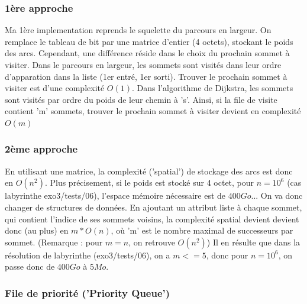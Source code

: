 \documentclass[10pt]{article}
\begin{document}
			\subsubsection{1ère approche}
				Ma 1ère implementation reprends le squelette du parcours en largeur.\newline\newline
				On remplace le tableau de bit par une matrice d'entier (4 octets), stockant le poids des arcs.\newline\newline
				Cependant, une différence réside dans le choix du prochain sommet à visiter. Dans le parcours en largeur,
				les sommets sont visités dans leur ordre d'apparation dans la liste (1er entré, 1er sorti).
				Trouver le prochain sommet à visiter est d'une complexité \textbf{\(O(1)\)}.
				Dans l'algorithme de Dijkstra, les sommets sont visités par ordre du poids de leur chemin à 's'.
				Ainsi, si la file de visite contient 'm' sommets, trouver le prochain sommet
				à visiter devient en complexité \(O(m)\)

			\subsubsection{2ème approche}								
				En utilisant une matrice, la complexité ('spatial') de stockage des arcs est donc en \(O(n^2)\).
				Plus précisement, si le poids est stocké sur 4 octet, pour \(n=10^6\) (cas labyrinthe exo3/tests/06),
				l'espace mémoire nécessaire est de \(400Go\)... On va donc changer de structures de données.
				En ajoutant un attribut liste à chaque sommet, qui contient l'indice de ses sommets voisins,
				la complexité spatial devient devient donc (au plus) en \(m * O(n)\), où 'm' est
				le nombre maximal de successeurs par sommet. (Remarque : pour \(m = n\), on retrouve \(O(n^2)\))
				Il en résulte que dans la résolution de labyrinthe (exo3/tests/06), on a \(m <= 5\), donc pour \(n=10^6\),
				on passe donc de \(400Go\) à \(5 Mo\).
				
			\subsubsection{File de priorité ('Priority Queue')}
			
\end{document}
